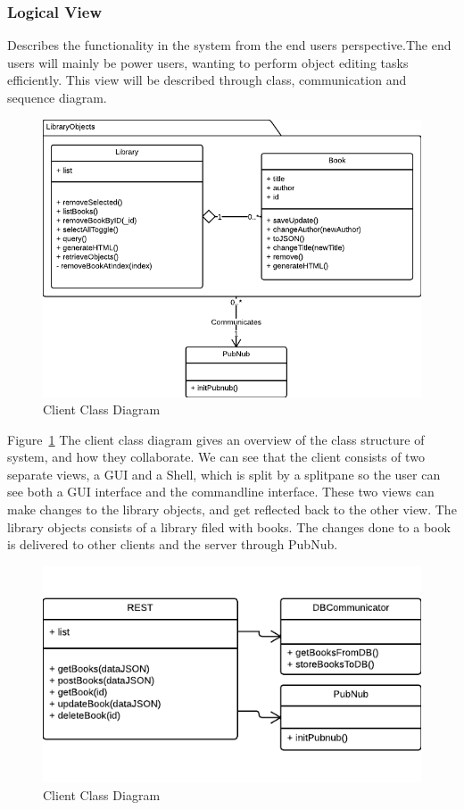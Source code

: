 \subsubsection{Logical View}
Describes the functionality in the system from the end users perspective.The end users will mainly be power users, wanting to perform object editing tasks efficiently. This view will be described through class, communication and sequence diagram.

\begin{figure}[h]
\centering
\includegraphics[width=6in]{image/architecture/s1/s1clientClassDiagram.png}
\caption{Client Class Diagram}
\label{figure:s1clientClassDiagram}
\end{figure}

Figure~\ref{figure:s1clientClassDiagram} The client class diagram gives an overview of the class structure of system, and how they collaborate. We can see that the client consists of two separate views, a GUI and a Shell, which is split by a splitpane so the user can see both a GUI interface and the commandline interface. These two views can make changes to the library objects, and get reflected back to the other view. The library objects consists of a library filed with books. The changes done to a book is delivered to other clients and the server through PubNub. 

\begin{figure}[h]
\centering
\includegraphics[width=5in]{image/architecture/s1/s1serverClassDiagram.png}
\caption{Client Class Diagram}
\label{figure:s1serverClassDiagram}
\end{figure}

